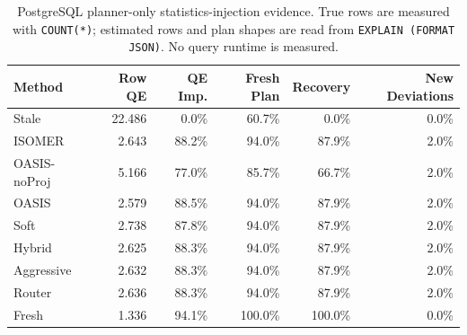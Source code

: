 \begin{table}[t]
  \centering
  \small
  \caption{PostgreSQL planner-only statistics-injection evidence. True rows are measured with \texttt{COUNT(*)}; estimated rows and plan shapes are read from \texttt{EXPLAIN (FORMAT JSON)}. No query runtime is measured.}
  \label{tab:postgres_planner_stats_injection}
  \setlength{\tabcolsep}{4pt}
  \begin{tabular}{lrrrrr}
    \toprule
    Method & Row QE & QE Imp. & Fresh Plan & Recovery & New Deviations \\
    \midrule
    Stale & 22.486 & 0.0\% & 60.7\% & 0.0\% & 0.0\% \\
    ISOMER & 2.643 & 88.2\% & 94.0\% & 87.9\% & 2.0\% \\
    OASIS-noProj & 5.166 & 77.0\% & 85.7\% & 66.7\% & 2.0\% \\
    OASIS & 2.579 & 88.5\% & 94.0\% & 87.9\% & 2.0\% \\
    Soft & 2.738 & 87.8\% & 94.0\% & 87.9\% & 2.0\% \\
    Hybrid & 2.625 & 88.3\% & 94.0\% & 87.9\% & 2.0\% \\
    Aggressive & 2.632 & 88.3\% & 94.0\% & 87.9\% & 2.0\% \\
    Router & 2.636 & 88.3\% & 94.0\% & 87.9\% & 2.0\% \\
    Fresh & 1.336 & 94.1\% & 100.0\% & 100.0\% & 0.0\% \\
    \bottomrule
  \end{tabular}
\end{table}
